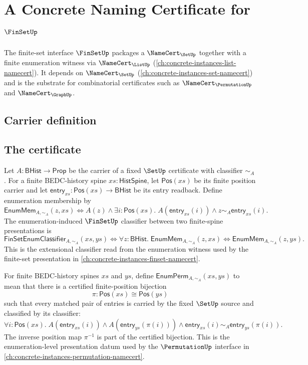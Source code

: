 \chapter{A Concrete Naming Certificate for $\FinSetUp$}
\label{ch:concrete-instances-finset-namecert}

The finite-set interface $\FinSetUp$ packages a $\NameCert_{\SetUp}$ together with a finite enumeration witness via $\NameCert_{\ListUp}$ (\autoref{ch:concrete-instances-list-namecert}). It depends on $\NameCert_{\SetUp}$ (\autoref{ch:concrete-instances-set-namecert}) and is the substrate for combinatorial certificates such as $\NameCert_{\PermutationUp}$ and $\NameCert_{\GraphUp}$.

\section{Carrier definition}
\label{sec:finset-carrier}

\section{The certificate}
\label{sec:finset-certificate}

\begin{definition}
\label{def:finset-enumeration-membership}
Let $A:\mathsf{BHist}\to\mathsf{Prop}$ be the carrier of a fixed $\SetUp$ certificate with classifier $\sim_A$. For a finite BEDC-history spine $xs:\mathsf{HistSpine}$, let $\mathsf{Pos}(xs)$ be its finite position carrier and let $\mathsf{entry}_{xs}:\mathsf{Pos}(xs)\to\mathsf{BHist}$ be its entry readback. Define enumeration membership by
$$
\mathsf{EnumMem}_{A,\sim_A}(z,xs)
\Longleftrightarrow
A(z)\land
\exists i:\mathsf{Pos}(xs).\;A(\mathsf{entry}_{xs}(i))\land z\sim_A\mathsf{entry}_{xs}(i).
$$
The enumeration-induced $\FinSetUp$ classifier between two finite-spine presentations is
$$
\mathsf{FinSetEnumClassifier}_{A,\sim_A}(xs,ys)
\Longleftrightarrow
\forall z:\mathsf{BHist}.\;
\mathsf{EnumMem}_{A,\sim_A}(z,xs)
\Longleftrightarrow
\mathsf{EnumMem}_{A,\sim_A}(z,ys).
$$
This is the extensional classifier read from the enumeration witness used by the finite-set presentation in \autoref{ch:concrete-instances-finset-namecert}.
\end{definition}

\begin{definition}
\label{def:finset-classifier-preserving-enumeration-permutation}
For finite BEDC-history spines $xs$ and $ys$, define $\mathsf{EnumPerm}_{A,\sim_A}(xs,ys)$ to mean that there is a certified finite-position bijection
$$
\pi:\mathsf{Pos}(xs)\cong\mathsf{Pos}(ys)
$$
such that every matched pair of entries is carried by the fixed $\SetUp$ source and classified by its classifier:
$$
\forall i:\mathsf{Pos}(xs).\;
A(\mathsf{entry}_{xs}(i))\land
A(\mathsf{entry}_{ys}(\pi(i)))\land
\mathsf{entry}_{xs}(i)\sim_A\mathsf{entry}_{ys}(\pi(i)).
$$
The inverse position map $\pi^{-1}$ is part of the certified bijection. This is the enumeration-level presentation datum used by the $\PermutationUp$ interface in \autoref{ch:concrete-instances-permutation-namecert}.
\end{definition}

